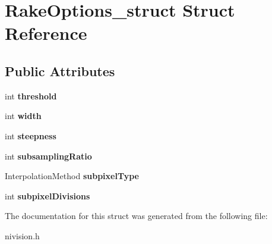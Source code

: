 \hypertarget{structRakeOptions__struct}{\section{\-Rake\-Options\-\_\-struct \-Struct \-Reference}
\label{structRakeOptions__struct}
}
\subsection*{\-Public \-Attributes}
\begin{DoxyCompactItemize}
\item 
\hypertarget{structRakeOptions__struct_ad749b2891d993a6b83c65fddc29d1a85}{int {\bfseries threshold}}\label{structRakeOptions__struct_ad749b2891d993a6b83c65fddc29d1a85}

\item 
\hypertarget{structRakeOptions__struct_a0d4aaa615112b780d7a5b0d3a82b419e}{int {\bfseries width}}\label{structRakeOptions__struct_a0d4aaa615112b780d7a5b0d3a82b419e}

\item 
\hypertarget{structRakeOptions__struct_a8bd558064939ff00372b0d9d2b530646}{int {\bfseries steepness}}\label{structRakeOptions__struct_a8bd558064939ff00372b0d9d2b530646}

\item 
\hypertarget{structRakeOptions__struct_adffcffc68e3c06d8e3c22af2548d7a85}{int {\bfseries subsampling\-Ratio}}\label{structRakeOptions__struct_adffcffc68e3c06d8e3c22af2548d7a85}

\item 
\hypertarget{structRakeOptions__struct_aff9c8f09658e80b207c42093ea8e412e}{\-Interpolation\-Method {\bfseries subpixel\-Type}}\label{structRakeOptions__struct_aff9c8f09658e80b207c42093ea8e412e}

\item 
\hypertarget{structRakeOptions__struct_a5e4a9de11e856a4715707077bc022010}{int {\bfseries subpixel\-Divisions}}\label{structRakeOptions__struct_a5e4a9de11e856a4715707077bc022010}

\end{DoxyCompactItemize}


\-The documentation for this struct was generated from the following file\-:\begin{DoxyCompactItemize}
\item 
nivision.\-h\end{DoxyCompactItemize}
